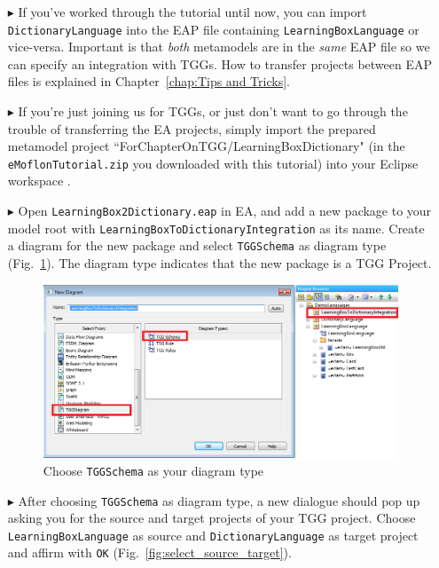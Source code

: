 \begin{enumerate}
\item[$\blacktriangleright$] If you've worked through the tutorial until now, you can import \texttt{Dic\-tion\-ary\-Language} into the EAP file containing \texttt{Learning\-Box\-Language} or vice-versa.
Important is that \emph{both} metamodels are in the \emph{same} EAP file so we can specify an integration with TGGs.
How to transfer projects between EAP files is explained in Chapter~\ref{chap:Tips and Tricks}.

\item[$\blacktriangleright$] If you're just joining us for TGGs, or just don't want to go through the trouble of transferring the EA projects, simply import the prepared metamodel project ``For\-Chapter\-On\-TGG/Learning\-Box\-Dic\-tion\-ary" (in the \texttt{eMoflon\-Tutorial.zip} you downloaded with this tutorial) into your Eclipse workspace .

\item[$\blacktriangleright$] Open \texttt{LearningBox2Dictionary.eap} in EA, and add a new package to your model root with \texttt{Learning\-Box\-To\-Dictionary\-Integration} as its name. 
Create a diagram for the new package and select \texttt{TGGSchema} as diagram type (Fig.~\ref{fig:tgg_diagram_type}). 
The diagram type indicates that the new package is a TGG Project. 

\begin{figure}[htbp]
\begin{center}
  \includegraphics[width=\textwidth]{pics/tggBilder/tggSchema/tgg1}
  \caption{Choose \texttt{TGGSchema} as your diagram type}  
  \label{fig:tgg_diagram_type}
\end{center}
\end{figure}

\item[$\blacktriangleright$] After choosing \texttt{TGGSchema} as diagram type, a new dialogue should pop up asking you for the source and target projects of your TGG project. 
Choose \texttt{Learning\-Box\-Language} as source and \texttt{Dictionary\-Language} as target project and affirm with \texttt{OK} (Fig.~\ref{fig:select_source_target}).


\end{enumerate}
